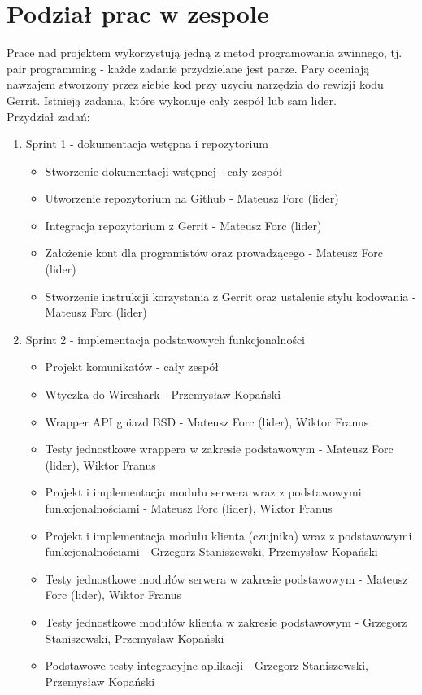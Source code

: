 \documentclass[a4paper,11pt]{article}
\begin{document}
\section{Podział prac w zespole}
Prace nad projektem wykorzystują jedną z metod programowania zwinnego,
tj. pair programming - każde zadanie przydzielane jest parze.
Pary oceniają nawzajem stworzony przez siebie kod przy uzyciu narzędzia do rewizji kodu Gerrit.
Istnieją zadania, które wykonuje cały zespół lub sam lider. \\
Przydział zadań:
\begin{enumerate}
\item Sprint 1 - dokumentacja wstępna i repozytorium
\begin{itemize}
\item Stworzenie dokumentacji wstępnej - cały zespół
\item Utworzenie repozytorium na Github - Mateusz Forc (lider)
\item Integracja repozytorium z Gerrit - Mateusz Forc (lider)
\item Założenie kont dla programistów oraz prowadzącego - Mateusz Forc (lider)
\item Stworzenie instrukcji korzystania z Gerrit oraz ustalenie stylu kodowania
      - Mateusz Forc (lider)
\end{itemize}
\item Sprint 2 - implementacja podstawowych funkcjonalności
\begin{itemize}
\item Projekt komunikatów - cały zespół
\item Wtyczka do Wireshark - Przemysław Kopański
\item Wrapper API gniazd BSD - Mateusz Forc (lider), Wiktor Franus
\item Testy jednostkowe wrappera w zakresie podstawowym - Mateusz Forc (lider), Wiktor Franus
\item Projekt i implementacja modułu serwera wraz z podstawowymi funkcjonalnościami
      - Mateusz Forc (lider), Wiktor Franus
\item Projekt i implementacja modułu klienta (czujnika) wraz z podstawowymi funkcjonalnościami
      - Grzegorz Staniszewski, Przemysław Kopański
\item Testy jednostkowe modułów serwera w zakresie podstawowym - Mateusz Forc (lider), Wiktor Franus
\item Testy jednostkowe modułów klienta w zakresie podstawowym
      - Grzegorz Staniszewski, Przemysław Kopański
\item Podstawowe testy integracyjne aplikacji - Grzegorz Staniszewski, Przemysław Kopański

\end{itemize}
\end{enumerate}
\end{document}

